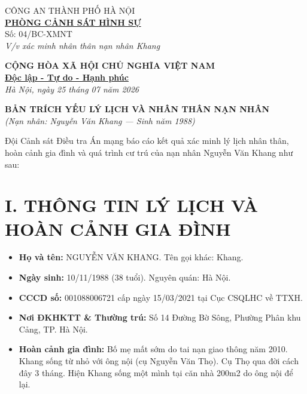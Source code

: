 \documentclass[12pt,a4paper]{article}
\begin{document}
\noindent
\begin{minipage}[t]{0.45\textwidth}
    \begin{center}
        \small
        CÔNG AN THÀNH PHỐ HÀ NỘI\\
        \textbf{\underline{PHÒNG CẢNH SÁT HÌNH SỰ}}\\[0.1cm]
        Số: 04/BC-XMNT\\
        \textit{V/v xác minh nhân thân nạn nhân Khang}
    \end{center}
\end{minipage}
\hfill
\begin{minipage}[t]{0.52\textwidth}
    \begin{center}
        \small
        \textbf{CỘNG HÒA XÃ HỘI CHỦ NGHĨA VIỆT NAM}\\
        \textbf{\underline{Độc lập - Tự do - Hạnh phúc}}\\[0.1cm]
        \textit{Hà Nội, ngày 25 tháng 07 năm 2026}
    \end{center}
\end{minipage}

\vspace{0.6cm}

\begin{center}
    \textbf{\large BẢN TRÍCH YẾU LÝ LỊCH VÀ NHÂN THÂN NẠN NHÂN}\\
    \textit{(Nạn nhân: Nguyễn Văn Khang — Sinh năm 1988)}
\end{center}

\vspace{0.3cm}

\noindent Đội Cảnh sát Điều tra Án mạng báo cáo kết quả xác minh lý lịch nhân thân, hoàn cảnh gia đình và quá trình cư trú của nạn nhân Nguyễn Văn Khang như sau:

\section*{I. THÔNG TIN LÝ LỊCH VÀ HOÀN CẢNH GIA ĐÌNH}
\begin{itemize}[leftmargin=1.5cm]
    \item \textbf{Họ và tên:} NGUYỄN VĂN KHANG. Tên gọi khác: Khang.
    \item \textbf{Ngày sinh:} 10/11/1988 (38 tuổi). Nguyên quán: Hà Nội.
    \item \textbf{CCCD số:} 001088006721 cấp ngày 15/03/2021 tại Cục CSQLHC về TTXH.
    \item \textbf{Nơi ĐKHKTT \& Thường trú:} Số 14 Đường Bờ Sông, Phường Phân khu Cảng, TP. Hà Nội.
    \item \textbf{Hoàn cảnh gia đình:} Bố mẹ mất sớm do tai nạn giao thông năm 2010. Khang sống từ nhỏ với ông nội (cụ Nguyễn Văn Thọ). Cụ Thọ qua đời cách đây 3 tháng. Hiện Khang sống một mình tại căn nhà 200m2 do ông nội để lại.
\end{itemize}
\end{document}
